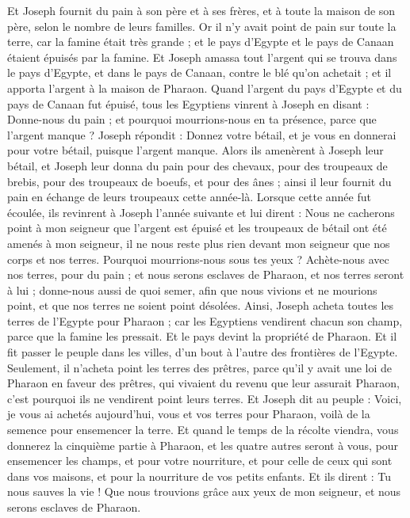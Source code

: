 \begin{multicols}{2}
Et Joseph fournit du pain à son père et à ses frères, et à toute la maison de son père, selon le nombre de leurs familles.
Or il n'y avait point de pain sur toute la terre, car la famine était très grande ; et le pays d'Egypte et le pays de Canaan étaient épuisés par la famine.
Et Joseph amassa tout l'argent qui se trouva dans le pays d'Egypte, et dans le pays de Canaan, contre le blé qu'on achetait ; et il apporta l'argent à la maison de Pharaon.
Quand l'argent du pays d'Egypte et du pays de Canaan fut épuisé, tous les Egyptiens vinrent à Joseph en disant : Donne-nous du pain ; et pourquoi mourrions-nous en ta présence, parce que l'argent manque ?
Joseph répondit : Donnez votre bétail, et je vous en donnerai pour votre bétail, puisque l'argent manque.
Alors ils amenèrent à Joseph leur bétail, et Joseph leur donna du pain pour des chevaux, pour des troupeaux de brebis, pour des troupeaux de boeufs, et pour des ânes ; ainsi il leur fournit du pain en échange de leurs troupeaux cette année-là.
Lorsque cette année fut écoulée, ils revinrent à Joseph l'année suivante et lui dirent : Nous ne cacherons point à mon seigneur que l'argent est épuisé et les troupeaux de bétail ont été amenés à mon seigneur, il ne nous reste plus rien devant mon seigneur que nos corps et nos terres.
Pourquoi mourrions-nous sous tes yeux ? Achète-nous avec nos terres, pour du pain ; et nous serons esclaves de Pharaon, et nos terres seront à lui ; donne-nous aussi de quoi semer, afin que nous vivions et ne mourions point, et que nos terres ne soient point désolées.
Ainsi, Joseph acheta toutes les terres de l'Egypte pour Pharaon ; car les Egyptiens vendirent chacun son champ, parce que la famine les pressait. Et le pays devint la propriété de Pharaon.
Et il fit passer le peuple dans les villes, d'un bout à l'autre des frontières de l'Egypte.
Seulement, il n'acheta point les terres des prêtres, parce qu'il y avait une loi de Pharaon en faveur des prêtres, qui vivaient du revenu que leur assurait Pharaon, c'est pourquoi ils ne vendirent point leurs terres.
Et Joseph dit au peuple : Voici, je vous ai achetés aujourd'hui, vous et vos terres pour Pharaon, voilà de la semence pour ensemencer la terre.
Et quand le temps de la récolte viendra, vous donnerez la cinquième partie à Pharaon, et les quatre autres seront à vous, pour ensemencer les champs, et pour votre nourriture, et pour celle de ceux qui sont dans vos maisons, et pour la nourriture de vos petits enfants.
Et ils dirent : Tu nous sauves la vie ! Que nous trouvions grâce aux yeux de mon seigneur, et nous serons esclaves de Pharaon.

\end{multicols}
